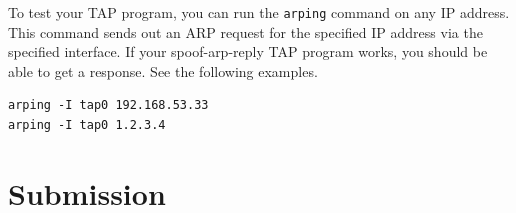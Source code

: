 To test your TAP program, you can run the \texttt{arping} command
on any IP address.  This command sends out an ARP request for the specified IP address 
via the specified interface. 
If your spoof-arp-reply TAP program works, you should be able to get a 
response. See the following examples. 

\begin{lstlisting}
arping -I tap0 192.168.53.33
arping -I tap0 1.2.3.4
\end{lstlisting}

 
 
\section{Submission}













